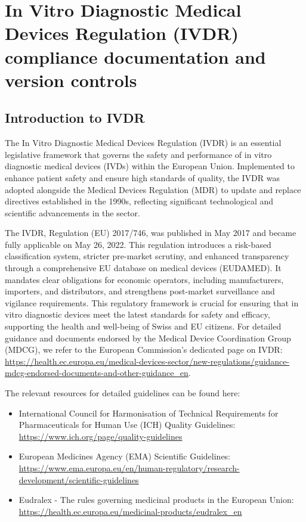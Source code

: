 \section{In Vitro Diagnostic Medical Devices Regulation (IVDR)  compliance documentation and version controls}

\subsection{Introduction to IVDR}

The In Vitro Diagnostic Medical Devices Regulation (IVDR) is an essential legislative framework that governs the safety and performance of in vitro diagnostic medical devices (IVDs) within the European Union. Implemented to enhance patient safety and ensure high standards of quality, the IVDR was adopted alongside the Medical Devices Regulation (MDR) to update and replace directives established in the 1990s, reflecting significant technological and scientific advancements in the sector.

The IVDR, Regulation (EU) 2017/746, was published in May 2017 and became fully applicable on May 26, 2022. This regulation introduces a risk-based classification system, stricter pre-market scrutiny, and enhanced transparency through a comprehensive EU database on medical devices (EUDAMED). It mandates clear obligations for economic operators, including manufacturers, importers, and distributors, and strengthens post-market surveillance and vigilance requirements. 
This regulatory framework is crucial for ensuring that in vitro diagnostic devices meet the latest standards for safety and efficacy, supporting the health and well-being of Swiss and EU citizens.
For detailed guidance and documents endorsed by the Medical Device Coordination Group (MDCG), we refer to the European Commission's dedicated page on IVDR: \url{https://health.ec.europa.eu/medical-devices-sector/new-regulations/guidance-mdcg-endorsed-documents-and-other-guidance_en}.

The relevant resources for detailed guidelines can be found here:
\begin{itemize}
    \item International Council for Harmonisation of Technical Requirements for Pharmaceuticals for Human Use (ICH) Quality Guidelines: \url{https://www.ich.org/page/quality-guidelines}
    \item European Medicines Agency (EMA) Scientific Guidelines: \url{https://www.ema.europa.eu/en/human-regulatory/research-development/scientific-guidelines}
    \item Eudralex - The rules governing medicinal products in the European Union: \url{https://health.ec.europa.eu/medicinal-products/eudralex_en}
\end{itemize}

